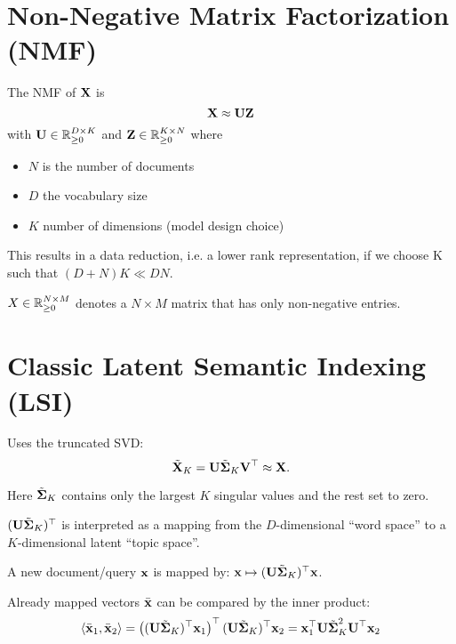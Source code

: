 \section{Non-Negative Matrix Factorization (NMF)}

\begin{definition}
The NMF of \(\boldsymbol{\mathrm{X}}\) is
\[
\boldsymbol{\mathrm{X}} \approx \boldsymbol{\mathrm{UZ}}
\]
with \(\boldsymbol{\mathrm{U}} \in \mathbb{R}_{\geq 0}^{D \times K}\) and \(\boldsymbol{\mathrm{Z}} \in \mathbb{R}_{\geq 0}^{K \times N}\) where
\begin{itemize}
\item \(N\) is the number of documents
\item \(D\) the vocabulary size
\item \(K\) number of dimensions (model design choice)
\end{itemize}

This results in a data reduction, i.e. a lower rank representation, if we choose K such that \((D+N)K \ll DN\).
\end{definition}

\begin{notation}
\(X \in \mathbb{R}_{\geq 0}^{N \times M}\) denotes a \(N \times M\) matrix that has only non-negative entries.
\end{notation}

\section{Classic Latent Semantic Indexing (LSI)}
Uses the truncated SVD:
\[
\tilde{\boldsymbol{\mathrm{X}}}_K = \boldsymbol{\mathrm{U}} \tilde{\boldsymbol{\mathrm{\Sigma}}}_K \boldsymbol{\mathrm{V}}^\top \approx \boldsymbol{\mathrm{X}}.
\]

Here \(\tilde{\boldsymbol{\mathrm{\Sigma}}}_K\) contains only the largest \(K\) singular values and the rest set to zero.

\((\boldsymbol{\mathrm{U}} \tilde{\boldsymbol{\mathrm{\Sigma}}}_K)^\top\) is interpreted as a mapping from the \(D\)-dimensional ``word space'' to a \(K\)-dimensional latent ``topic space''.

A new document/query \(\boldsymbol{\mathrm{x}}\) is mapped by: \( \boldsymbol{\mathrm{x}} \mapsto (\boldsymbol{\mathrm{U}} \tilde{\boldsymbol{\mathrm{\Sigma}}}_K)^\top \boldsymbol{\mathrm{x}}\). 

Already mapped vectors \(\bar{\boldsymbol{\mathrm{x}}}\) can be compared by the inner product:
\[
\left\langle \bar{\boldsymbol{\mathrm{x}}}_1, \bar{\boldsymbol{\mathrm{x}}}_2 \right\rangle = \left(
(\boldsymbol{\mathrm{U}} \tilde{\boldsymbol{\mathrm{\Sigma}}}_K)^\top \boldsymbol{\mathrm{x}}_1
\right)^\top (\boldsymbol{\mathrm{U}} \tilde{\boldsymbol{\mathrm{\Sigma}}}_K)^\top \boldsymbol{\mathrm{x}}_2 = \boldsymbol{\mathrm{x}}_1^\top \boldsymbol{\mathrm{U}} \tilde{\boldsymbol{\mathrm{\Sigma}}}_K^2 \boldsymbol{\mathrm{U}}^\top \boldsymbol{\mathrm{x}}_2
\]

